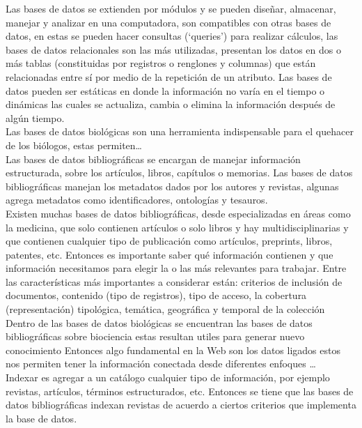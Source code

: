 \documentclass[../Main.tex]{subfiles}
\begin{document}
Las bases de datos se extienden por módulos y se pueden diseñar, almacenar, manejar y analizar en una computadora, son compatibles con otras bases de datos, en estas se pueden hacer consultas (‘queries’) para realizar cálculos, las bases de datos relacionales son las más utilizadas, presentan los datos en dos o más tablas (constituidas por registros o renglones y columnas) que están relacionadas entre sí por medio de la repetición de un atributo.
Las bases de datos pueden ser estáticas en donde la información no varía en el tiempo o dinámicas las cuales se actualiza, cambia o elimina la información después de algún tiempo. \\

Las bases de datos biológicas son una herramienta indispensable para el quehacer de los biólogos, estas permiten…\\

Las bases de datos bibliográficas se encargan de manejar información estructurada, sobre los artículos, libros, capítulos o memorias. Las bases de datos bibliográficas manejan los metadatos dados por los autores y revistas, algunas agrega metadatos como identificadores, ontologías y tesauros. \\

Existen muchas bases de datos bibliográficas, desde especializadas en áreas como la medicina, que solo contienen artículos o solo libros y hay multidisciplinarias y que contienen cualquier tipo de publicación como artículos, preprints, libros, patentes, etc. Entonces es importante saber qué información contienen y que información necesitamos para elegir la o las más relevantes para trabajar. Entre las características más importantes a considerar están: criterios de inclusión de documentos, contenido (tipo de registros), tipo de acceso, la cobertura (representación) tipológica, temática, geográfica y temporal de la colección
Dentro de las bases de datos biológicas se encuentran las bases de datos bibliográficas sobre biociencia estas resultan utiles para generar nuevo conocimiento
Entonces algo fundamental en la Web son los datos ligados estos nos permiten tener la información conectada desde diferentes enfoques …\\

Indexar es  agregar a un catálogo cualquier tipo de información, por ejemplo revistas, artículos, términos estructurados, etc. Entonces se tiene que las bases de datos bibliográficas indexan revistas de acuerdo a ciertos criterios que implementa la base de datos.\\
    
\end{document}
